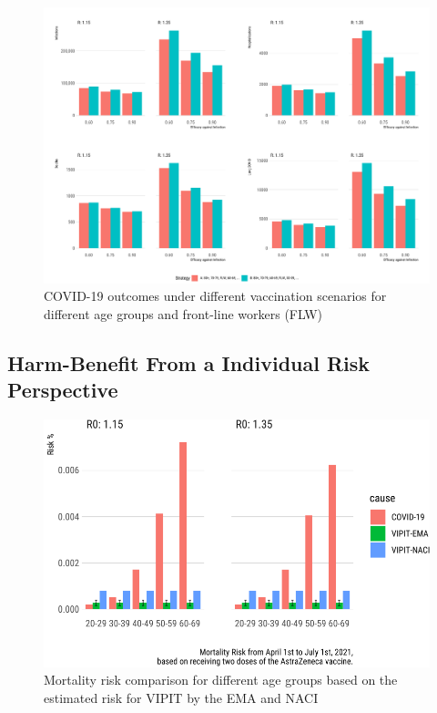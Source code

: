 \documentclass[]{interact}
\theoremstyle{plain}%
\theoremstyle{definition}
\theoremstyle{remark}
\begin{document}
\begin{figure}

{\centering \includegraphics[width=1\linewidth]{../figures/fig-barplots} 

}

\caption{COVID-19 outcomes under different vaccination scenarios for different age groups and front-line workers (FLW)}\label{fig:fig2}
\end{figure}

\hypertarget{harm-benefit-from-a-individual-risk-perspective}{%
\subsection{Harm-Benefit From a Individual Risk
Perspective}\label{harm-benefit-from-a-individual-risk-perspective}}

\begin{figure}

{\centering \includegraphics[width=0.9\linewidth]{theCaseforAZ_files/figure-latex/covidvsvipit-1} 

}

\caption{Mortality risk comparison for different age groups based on the estimated risk for VIPIT by the EMA and NACI}\label{fig:covidvsvipit}
\end{figure}
\end{document}
